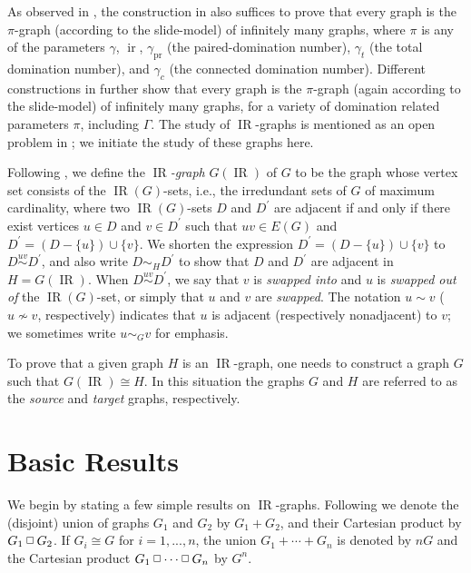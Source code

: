 \documentclass[12pt]{article}%
\providecommand{\boksie}{\ensuremath{\mathbin{\raisebox{0.3mm}{$\scriptstyle\square$}}}}
\begin{document}
As observed in \cite{Laura1}, the construction in \cite{CHH10} also suffices
to prove that every graph is the $\pi$-graph (according to the slide-model) of
infinitely many graphs, where $\pi$ is any of the parameters $\gamma$,
$\operatorname{ir}$, $\gamma_{\operatorname{pr}}$ (the paired-domination
number), $\gamma_{t}$ (the total domination number), and $\gamma_{c}$ (the
connected domination number). Different constructions in \cite{Laura1} further
show that every graph is the $\pi$-graph (again according to the slide-model)
of infinitely many graphs, for a variety of domination related parameters
$\pi$, including $\Gamma$. The study of $\operatorname{IR}$-graphs is
mentioned as an open problem in \cite{Laura1}; we initiate the study of these
graphs here.

Following \cite{FHHH11}, we define the \emph{$\operatorname{IR}$-graph
}$G(\operatorname{IR})$\emph{ }of \emph{$G$} to be the graph whose vertex set
consists of the $\operatorname{IR}(G)$-sets, i.e., the irredundant sets of $G$
of maximum cardinality, where two $\operatorname{IR}(G)$-sets $D$ and
$D^{\prime}$ are adjacent if and only if there exist vertices $u\in D$ and
$v\in D^{\prime}$ such that $uv\in E(G)$ and $D^{\prime}=(D-\{u\})\cup\{v\}$.
We shorten the expression $D^{\prime}=(D-\{u\})\cup\{v\}$ to
$D\overset{uv}{\sim}D^{\prime}$, and also write $D\sim_{H}D^{\prime}$ to show
that $D$ and $D^{\prime}$ are adjacent in $H=G(\operatorname{IR})$. When
$D\overset{uv}{\sim}D^{\prime}$, we say that $v$ is \emph{swapped into} and
$u$ is \emph{swapped out of} the $\operatorname{IR}(G)$-set, or simply that
$u$ and $v$ are \emph{swapped}. The notation $u\sim v$ ($u\nsim v$,
respectively) indicates that $u$ is adjacent (respectively nonadjacent) to
$v$; we sometimes write $u\sim_{G}v$ for emphasis.

To prove that a given graph $H$ is an $\operatorname{IR}$-graph, one needs to
construct a graph $G$ such that $G(\operatorname{IR})\cong H$. In this
situation the graphs $G$ and $H$ are referred to as the \emph{source} and
\emph{target }graphs, respectively.

\section{Basic Results}

\label{Sec_Basic}We begin by stating a few simple results on
$\operatorname{IR}$-graphs. Following \cite{CLZ} we denote the (disjoint)
union of graphs $G_{1}$ and $G_{2}$ by $G_{1}+G_{2}$, and their Cartesian
product by $G_{1}\boksie G_{2}$. If $G_{i}\cong G$ for $i=1,...,n$, the union
$G_{1}+\cdots+G_{n}$ is denoted by $nG$ and the Cartesian product
$G_{1}\boksie\cdots\boksie G_{n}$ by $G^{n}$.
\end{document}
